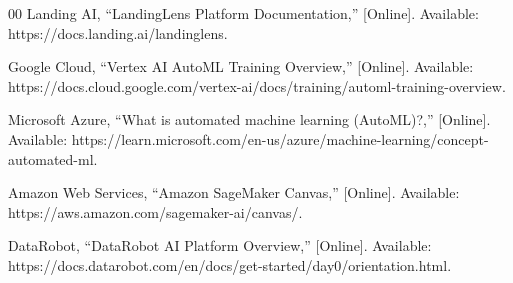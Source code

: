 \documentclass[conference]{IEEEtran}
\begin{document}
\begin{thebibliography}{00}
Landing AI, ``LandingLens Platform Documentation,'' [Online]. Available: https://docs.landing.ai/landinglens.

Google Cloud, ``Vertex AI AutoML Training Overview,'' [Online]. Available: https://docs.cloud.google.com/vertex-ai/docs/training/automl-training-overview.

Microsoft Azure, ``What is automated machine learning (AutoML)?,'' [Online]. Available: https://learn.microsoft.com/en-us/azure/machine-learning/concept-automated-ml.

Amazon Web Services, ``Amazon SageMaker Canvas,'' [Online]. Available: https://aws.amazon.com/sagemaker-ai/canvas/.

DataRobot, ``DataRobot AI Platform Overview,'' [Online]. Available: https://docs.datarobot.com/en/docs/get-started/day0/orientation.html.

\end{thebibliography}
\end{document}
